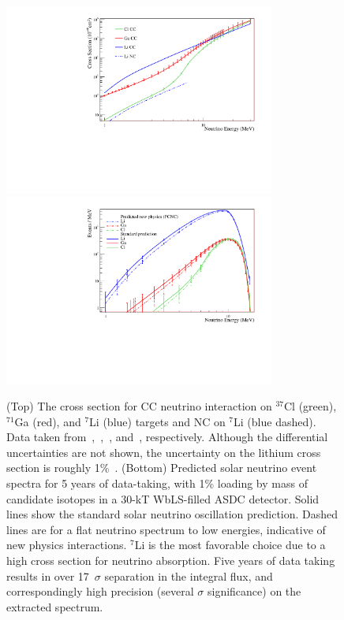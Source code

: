 \begin{figure}[!ht]
\begin{center}
\includegraphics[width=3.5in]{solar/xsecnc.pdf}
\includegraphics[width=3.5in]{solar/spectrume.pdf}
\caption{(Top) The cross section for CC neutrino interaction on $^{37}$Cl (green), $^{71}$Ga (red), and $^{7}$Li (blue) targets and NC on $^{7}$Li (blue dashed).  Data taken from~\cite{sigcl},~\cite{sigga},~\cite{sigli}, and~\cite{signc}, respectively. Although the differential uncertainties are not shown, the uncertainty on the lithium cross section is roughly 1\%~\cite{li}. (Bottom)  Predicted solar neutrino event spectra for 5 years of data-taking, with 1\% loading by mass of candidate isotopes in a 30-kT WbLS-filled ASDC detector. Solid lines show the standard solar neutrino oscillation prediction.  Dashed lines are for a flat neutrino spectrum to low energies, indicative of new physics interactions.  $^7$Li is the most favorable choice due to a high cross section for neutrino absorption.  Five years of data taking results in over 17~$\sigma$ separation in the integral flux, and correspondingly high precision (several $\sigma$ significance) on the extracted spectrum.
\label{f:clga}}
\end{center}
\vspace{-1.\baselineskip}
\end{figure}

